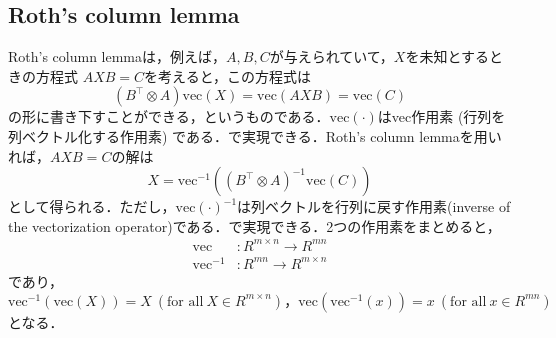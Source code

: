 \subsection{Roth's column lemma}Roth's column lemmaは，例えば，$A, B, C$が与えられていて，$X$を未知とするときの方程式 $AXB = C$を考えると，この方程式は
$$
(B^\top \otimes A)\text{vec}(X) = \text{vec}(AXB)=\text{vec}(C)
$$
の形に書き下すことができる，というものである．$\text{vec}(\cdot)$はvec作用素 (行列を列ベクトル化する作用素) である．で実現できる．Roth's column lemmaを用いれば，$AXB = C$の解は
$$
X = \text{vec}^{-1}\left((B^\top \otimes A)^{-1}\text{vec}(C)\right)
$$
として得られる．ただし，$\text{vec}(\cdot)^{-1}$は列ベクトルを行列に戻す作用素(inverse of the vectorization operator)である．で実現できる．2つの作用素をまとめると，
$$
\begin{align}
\text{vec} &: R^{m\times n}\to R^{mn}\\
\text{vec}^{−1} &: R^{mn}\to R^{m×n}
\end{align}
$$
であり，$\text{vec}^{−1}\left(\text{vec}(X)\right)=X\ (\text{for all}\ X\in R^{m\times n})，\text{vec}\left(\text{vec}^{−1}(x)\right)=x\ (\text{for all}\ x \in R^{mn})$となる．